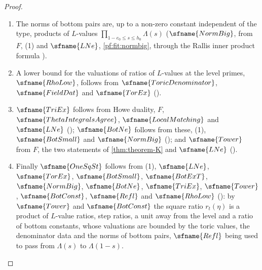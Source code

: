 \begin{proof}
\begin{enumerate}[label=(\arabic*),leftmargin=*]
( and ).
\item The norms of bottom pairs are, up to a non-zero constant independent of the type, products of $L$-values
$\prod_{1-e_0\le s\le h_0}\Lambda(s)$ ($\sfname{NormBig}$, from $F$, (1) and $\sfname{LNe}$, \cref{pf:fit:normbig}, through the
Rallis inner product formula \cite{Rallis1984}).
\item A lower bound for the valuations of ratios of $L$-values at the level primes, $\sfname{RhoLow}$, follows from
$\sfname{ToricDenominator}$, $\sfname{FieldDat}$ and $\sfname{TorEx}$ ().
\item $\sfname{TriEx}$ follows from Howe duality, $F$, $\sfname{ThetaIntegralsAgree}$, $\sfname{LocalMatching}$ and
$\sfname{LNe}$ (); $\sfname{BotNe}$ follows from these, (1), $\sfname{BotSmall}$ and
$\sfname{NormBig}$ (); and $\sfname{Tower}$ from $F$, the two statements
of \cref{thm:theorem-K} and $\sfname{LNe}$ ().
\item Finally $\sfname{OneSqSt}$ follows from (1), $\sfname{LNe}$, $\sfname{TorEx}$, $\sfname{BotSmall}$, $\sfname{BotExT}$,
$\sfname{NormBig}$, $\sfname{BotNe}$, $\sfname{TriEx}$, $\sfname{Tower}$, $\sfname{BotConst}$, $\sfname{Refl}$ and
$\sfname{RhoLow}$ (): by $\sfname{Tower}$ and
$\sfname{BotConst}$ the square ratio $r_t(\eta)$ is a product of $L$-value ratios, step ratios, a unit away from the level and
a ratio of bottom constants, whose valuations are bounded by the toric values, the denominator data and the norms of
bottom pairs, $\sfname{Refl}$ being used to pass from $\Lambda(s)$ to $\Lambda(1-s)$.\qedhere
\end{enumerate}
\end{proof}

